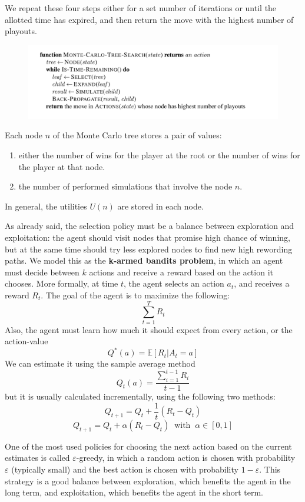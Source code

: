 \documentclass{article}
\begin{document}
We repeat these four steps either for a set number of iterations or until the allotted time has expired, and then return the move with the highest number of playouts.

\begin{figure}[h]
    \centering
    \includegraphics[width=1\linewidth]{algorithms/Monte Carlo Search.png}
    \label{fig:monte_carlo_search_algorithm}
\end{figure}



\noindent Each node $n$ of the Monte Carlo tree stores a pair of values:
\begin{enumerate}
    \item either the number of wins for the player at the root or the number of wins for the player at that node.
    \item the number of performed simulations that involve the node $n$.
\end{enumerate}
In general, the utilities $U(n)$ are stored in each node. 

As already said, the selection policy must be a balance between exploration and exploitation: the agent should visit nodes that promise high chance of winning, but at the same time should try less explored nodes to find new high rewording paths.
We model this as the \textbf{k-armed bandits problem}, in which an agent must decide between $k$ actions and receive a reward based on the action it chooses. More formally, at time $t$, the agent selects an action $a_t$, and receives a reward $R_t$. The goal of the agent is to maximize the following:
    $$\sum_{t=1}^{T}R_t$$
Also, the agent must learn how much it should expect from every action, or the action-value
    $$Q^*(a) = \mathbb{E}[R_t|A_t=a]$$
We can estimate it using the sample average method
    $$Q_t(a) = \frac{\sum_{i=1}^{t-1}R_i}{t-1}$$
but it is usually calculated incrementally, using the following two methods:
    $$Q_{t+1}=Q_t+\frac{1}{t}(R_t-Q_t)$$
    $$Q_{t+1}=Q_t+\alpha(R_t-Q_t)\;\; \text{with}\;\; \alpha\in [0,1]$$

One of the most used policies for choosing the next action based on the current estimates is called $\varepsilon$-greedy, in which a random action is chosen with probability $\varepsilon$ (typically small) and the best action is chosen with probability $1-\varepsilon$. This strategy is a good balance between exploration, which benefits the agent in the long term, and exploitation, which benefits the agent in the short term.
\end{document}
